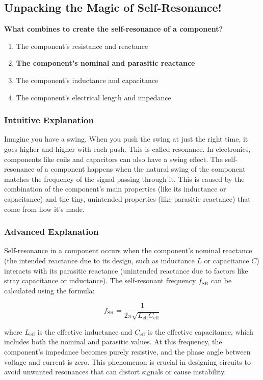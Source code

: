 \subsection{Unpacking the Magic of Self-Resonance!}
\label{sec:E5D07}

\begin{tcolorbox}[colback=gray!10!white,colframe=black!75!black,title=\textbf{E5D07}]
\textbf{What combines to create the self-resonance of a component?}
\begin{enumerate}[label=\Alph*.]
    \item The component’s resistance and reactance
    \item \textbf{The component’s nominal and parasitic reactance}
    \item The component’s inductance and capacitance
    \item The component’s electrical length and impedance
\end{enumerate}
\end{tcolorbox}

\subsubsection{Intuitive Explanation}
Imagine you have a swing. When you push the swing at just the right time, it goes higher and higher with each push. This is called resonance. In electronics, components like coils and capacitors can also have a swing effect. The self-resonance of a component happens when the natural swing of the component matches the frequency of the signal passing through it. This is caused by the combination of the component's main properties (like its inductance or capacitance) and the tiny, unintended properties (like parasitic reactance) that come from how it's made.

\subsubsection{Advanced Explanation}
Self-resonance in a component occurs when the component's nominal reactance (the intended reactance due to its design, such as inductance \(L\) or capacitance \(C\)) interacts with its parasitic reactance (unintended reactance due to factors like stray capacitance or inductance). The self-resonant frequency \(f_{\text{SR}}\) can be calculated using the formula:

\[
f_{\text{SR}} = \frac{1}{2\pi\sqrt{L_{\text{eff}} C_{\text{eff}}}}
\]

where \(L_{\text{eff}}\) is the effective inductance and \(C_{\text{eff}}\) is the effective capacitance, which includes both the nominal and parasitic values. At this frequency, the component's impedance becomes purely resistive, and the phase angle between voltage and current is zero. This phenomenon is crucial in designing circuits to avoid unwanted resonances that can distort signals or cause instability.

